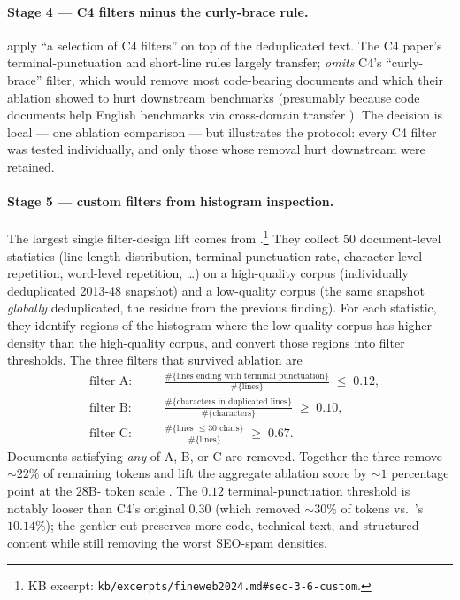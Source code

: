 \paragraph{Stage 4 --- C4 filters minus the curly-brace rule.}
\citet[\S 3.7]{fineweb2024} apply ``a selection of C4 filters'' on
top of the deduplicated text. The C4 paper's terminal-punctuation
and short-line rules largely transfer;  \emph{omits} C4's
``curly-brace'' filter, which would remove most code-bearing
documents and which their ablation showed to hurt downstream
benchmarks (presumably because code documents help English
benchmarks via cross-domain transfer \citep[\S 3.2,
$t_{ij}$]{data-mixing-laws-2024}). The decision is local --- one
ablation comparison --- but illustrates the protocol: every C4
filter was tested individually, and only those whose removal hurt
downstream were retained.

\paragraph{Stage 5 --- custom filters from histogram inspection.}
The largest single filter-design lift comes from
\citet[\S 3.6]{fineweb2024}.\footnote{KB excerpt:
\texttt{kb/excerpts/fineweb2024.md\#sec-3-6-custom}.} They collect
$50$ document-level statistics (line length distribution, terminal
punctuation rate, character-level repetition, word-level repetition,
\dots) on a high-quality corpus (individually deduplicated 2013-48
snapshot) and a low-quality corpus (the same snapshot
\emph{globally} deduplicated, the residue from the previous
finding). For each statistic, they identify regions of the histogram
where the low-quality corpus has higher density than the high-quality
corpus, and convert those regions into filter thresholds. The three
filters that survived ablation are
\begin{align}
&\text{filter A:} \quad &&\frac{\#\{\text{lines ending with terminal punctuation}\}}{\#\{\text{lines}\}} \;\leq\; 0.12, \nonumber \\
&\text{filter B:} \quad &&\frac{\#\{\text{characters in duplicated lines}\}}{\#\{\text{characters}\}} \;\geq\; 0.10, \nonumber \\
&\text{filter C:} \quad &&\frac{\#\{\text{lines $\leq 30$ chars}\}}{\#\{\text{lines}\}} \;\geq\; 0.67. \nonumber
\end{align}
Documents satisfying \emph{any} of A, B, or C are removed. Together
the three remove $\sim 22\%$ of remaining tokens and lift the
aggregate ablation score by $\sim 1$ percentage point at the $28$B-
token scale \citep[\S 3.6]{fineweb2024}. The $0.12$ terminal-punctuation
threshold is notably looser than C4's original $0.30$ (which removed
$\sim 30\%$ of tokens vs.\ 's $10.14\%$); the gentler cut
preserves more code, technical text, and structured content while
still removing the worst SEO-spam densities.

